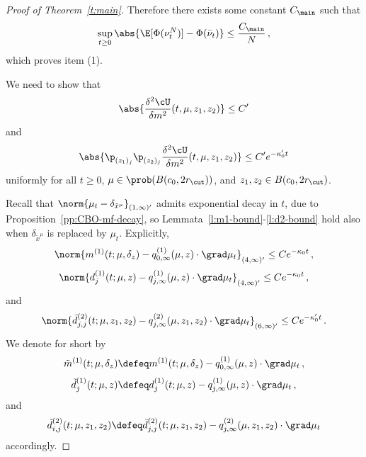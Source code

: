 \documentclass{amsart}
\begin{document}
\begin{proof}[Proof of Theorem~\ref{t:main}]
	Therefore there exists some constant $C_\main$ such that 
	\begin{equation*}
		\sup_{t \ge 0} \abs{ \E[\Phi(\nu^N_t)] - \Phi(\bar\nu_t) } \le \frac{C_\main}{N} \,,
	\end{equation*}
	which proves item (1).
	\fi 

    We need to show that 
    \begin{equation*}
        \abs{ \frac{\delta^2 \cU}{\delta m^2} (t,\mu,z_1,z_2) } \le C'
    \end{equation*}
    and 
    \begin{equation*}
        \abs{ \p_{(z_1)_j} \p_{(z_2)_j} \frac{\delta^2 \cU}{\delta m^2} (t,\mu,z_1,z_2) } \le C' e^{-\kappa_0' t}
    \end{equation*}
    uniformly for all $t \ge 0$, $\mu \in \prob(B(c_0, 2r_\cut))$, and $z_1, z_2 \in B(c_0, 2r_\cut)$.
    
    Recall that $\norm{\mu_t - \delta_{\tilde x^\mu}}_{(1,\infty)'}$ admits exponential decay in $t$, due to Proposition~\ref{pp:CBO-mf-decay}, so Lemmata~\ref{l:m1-bound}-\ref{l:d2-bound} hold also when $\delta_{\tilde x^\mu}$ is replaced by $\mu_t$. 
    Explicitly, 
    \begin{equation*}
        \norm{m^{(1)}(t;\mu,\delta_z) - q^{(1)}_{0,\infty}(\mu,z) \cdot \grad \mu_t }_{(4,\infty)'} \le C e^{-\kappa_0 t} \,, 
    \end{equation*}
    \begin{equation*}
        \norm{d^{(1)}_j(t;\mu,z) - q^{(1)}_{j,\infty}(\mu,z) \cdot \grad \mu_t }_{(4,\infty)'} \le C e^{-\kappa_0 t} \,, 
    \end{equation*}
    and 
    \begin{equation*}
        \norm{\bar d^{(2)}_{j,j}(t;\mu,z_1,z_2) - q^{(2)}_{j,\infty}(\mu,z_1,z_2) \cdot \grad \mu_t }_{(6,\infty)'} \le C e^{-\kappa_0' t} \,.
    \end{equation*}
    We denote for short by 
    \begin{equation*}
        \tilde m^{(1)}(t;\mu,\delta_z) \defeq m^{(1)}(t;\mu,\delta_z) - q^{(1)}_{0,\infty}(\mu,z) \cdot \grad \mu_t  \,,
    \end{equation*}
    \begin{equation*}
        \tilde d^{(1)}_j(t;\mu,z) \defeq d^{(1)}_j(t;\mu,z) - q^{(1)}_{j,\infty}(\mu,z) \cdot \grad \mu_t  \,,
    \end{equation*}
    and 
    \begin{equation*}
        \tilde d^{(2)}_{i,j}(t;\mu,z_1,z_2) \defeq \bar d^{(2)}_{j,j}(t;\mu,z_1,z_2) - q^{(2)}_{j,\infty}(\mu,z_1,z_2) \cdot \grad \mu_t 
    \end{equation*}
    accordingly.


\end{proof}
\end{document}
